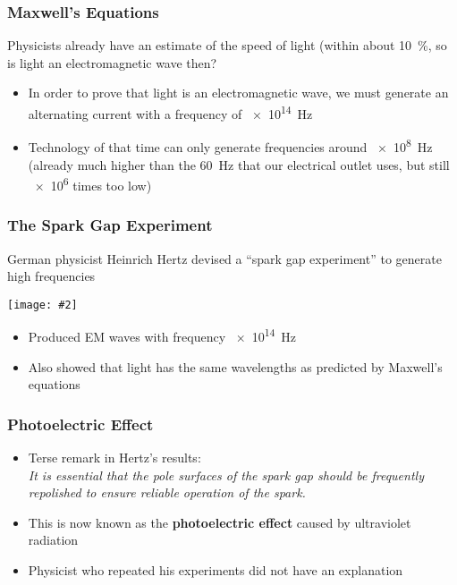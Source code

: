 \documentclass[12pt,compress,aspectratio=169]{beamer}
\newcommand{\pic}[2]{\texttt{[image: \#2]}}
\begin{document}
\begin{frame}
  \frametitle{Maxwell's Equations}
  Physicists already have an estimate of the speed of light (within about
  \SI{10}{\percent}, so is light an electromagnetic wave then?
  \begin{itemize}
  \item In order to prove that light is an electromagnetic wave, we must
    generate an alternating current with a frequency of \SI{e14}{\hertz}
  \item Technology of that time can only generate frequencies around
    \SI{e8}{\hertz} (already much higher than the \SI{60}{\hertz} that our
    electrical outlet uses, but still \num{e6} times too low)
  \end{itemize}
\end{frame}



\begin{frame}
  \frametitle{The Spark Gap Experiment}
  German physicist Heinrich Hertz devised a ``spark gap experiment'' to
  generate high frequencies
  \begin{center}
    \pic{.5}{Hertz_exp_2.png}
  \end{center}
  \begin{itemize}
  \item Produced EM waves with frequency \SI{e14}{\hertz}
  \item Also showed that light has the same wavelengths as predicted by
    Maxwell's equations
  \end{itemize}
\end{frame}


\begin{frame}
  \frametitle{Photoelectric Effect}
  \begin{itemize}
  \item Terse remark in Hertz's results:\\
    \emph{It is essential that the pole surfaces of the spark gap should be
      frequently repolished to ensure reliable operation of the spark.}
  \item This is now known as the \textbf{photoelectric effect} caused by
    ultraviolet radiation
  \item Physicist who repeated his experiments did not have an explanation
  \end{itemize}
\end{frame}
\end{document}
